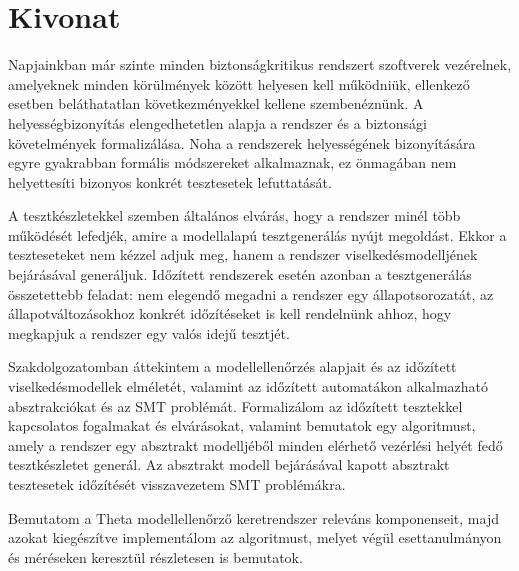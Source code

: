 
\setcounter{page}{1}

\selecthungarian

\chapter*{Kivonat}

Napjainkban már szinte minden biztonságkritikus rendszert szoftverek vezérelnek, amelyeknek minden körülmények között helyesen kell működniük, ellenkező esetben beláthatatlan következményekkel kellene szembenéznünk. A helyességbizonyítás elengedhetetlen alapja a rendszer és a biztonsági követelmények formalizálása. Noha a rendszerek helyességének bizonyítására egyre gyakrabban formális módszereket alkalmaznak, ez önmagában nem helyettesíti bizonyos konkrét tesztesetek lefuttatását.

A tesztkészletekkel szemben általános elvárás, hogy a rendszer minél több működését lefedjék, amire a modellalapú tesztgenerálás nyújt megoldást. Ekkor a teszteseteket nem kézzel adjuk meg, hanem a rendszer viselkedésmodelljének bejárásával generáljuk. Időzített rendszerek esetén azonban a tesztgenerálás összetettebb feladat: nem elegendő megadni a rendszer egy állapotsorozatát, az állapotváltozásokhoz konkrét időzítéseket is kell rendelnünk ahhoz, hogy megkapjuk a rendszer egy valós idejű tesztjét.

Szakdolgozatomban áttekintem a modellellenőrzés alapjait és az időzített viselkedésmodellek elméletét, valamint az időzített automatákon alkalmazható absztrakciókat és az SMT problémát. Formalizálom az időzített tesztekkel kapcsolatos fogalmakat és elvárásokat, valamint bemutatok egy algoritmust, amely a rendszer egy absztrakt modelljéből minden elérhető vezérlési helyét fedő tesztkészletet generál. Az absztrakt modell bejárásával kapott absztrakt tesztesetek időzítését visszavezetem SMT problémákra.

Bemutatom a Theta modellellenőrző keretrendszer releváns komponenseit, majd azokat kiegészítve implementálom az algoritmust, melyet végül esettanulmányon és méréseken keresztül részletesen is bemutatok.

\vfill
\selectenglish


